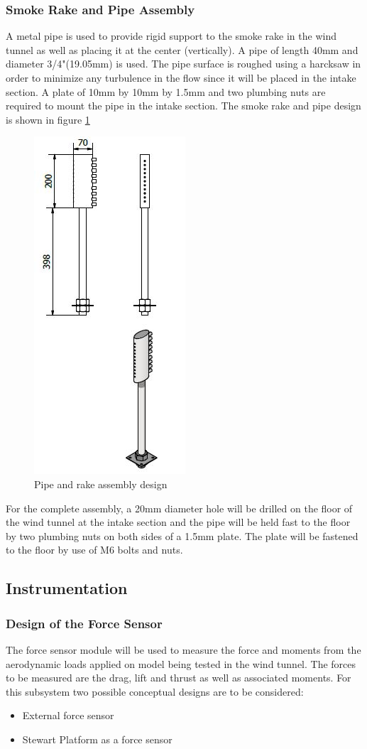 \subsubsection*{Smoke Rake and Pipe Assembly}
A metal pipe is used to provide rigid support to the smoke rake in the wind tunnel as well as placing it at the center
(vertically). A pipe of length 40mm and diameter 3/4"(19.05mm) is used. The pipe surface is roughed using a harcksaw in
order to minimize any turbulence in the flow since it will be placed in the intake section. A plate of 10mm by 10mm by 1.5mm
and two plumbing nuts are required to mount the pipe in the intake section. The smoke rake and pipe design is shown
in figure \ref{pipe and rake}
\begin{center}
	\begin{figure}[H]
		\centering
		\includegraphics[width=0.25\linewidth]{Figures/pipe and rake.JPG}
		\caption[Pipe and rake]{Pipe and rake assembly design}
		\label{pipe and rake}
	\end{figure}
\end{center}
For the complete assembly, a 20mm diameter hole will be drilled on the floor of the wind tunnel at the intake section
and the pipe will be held fast to the floor by two plumbing nuts on both sides of a 1.5mm plate. The plate will be fastened to
the floor by use of M6 bolts and nuts.
\subsection{Instrumentation}
\subsubsection{Design of the Force Sensor}
The force sensor module will be used to measure the force and moments from the aerodynamic loads applied on model being tested in the wind tunnel. The forces to be measured are the drag, lift and thrust as well as associated moments. For this subsystem two possible conceptual designs are to be considered:
\begin{itemize}
	\item External force sensor
	\item Stewart Platform as a force sensor
\end{itemize}
